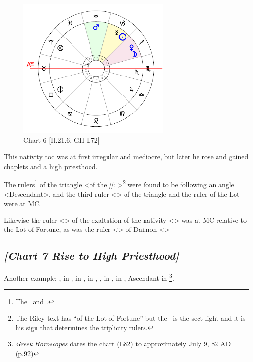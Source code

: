 \clearpage
\begin{figure}
\centering
\vspace{-20pt}
\includegraphics[width=0.68\textwidth]{charts/2_21_6}
\caption{Chart 6 [II.21.6, GH L72]}
\label{fig:chart06}
\end{figure}

This nativity too was at first irregular and mediocre, but later he rose and gained chaplets and a high priesthood. 

The rulers\footnote{The \Moon\, and \Venus.} of the triangle <of the \textsl{[\Sun]}: \Taurus\xspace \Virgo\xspace \Capricorn>\footnote{The Riley text has ``of the Lot of Fortune'' but the \Sun\, is the sect light and it is his sign that determines the triplicity rulers.}  were found to be following an angle <Descendant>, and the third ruler <\Mars> of the triangle and the ruler of the Lot were at MC. 

Likewise the ruler <\Sun> of the exaltation of the nativity <\Leo> was at MC relative to the Lot of Fortune, as was the ruler <\Mercury> of Daimon <\Gemini>

\newpage
\subsection*{\textit{[Chart 7 Rise to High Priesthood]}}

Another example: \Sun, \Mercury\xspace in \Cancer, \Moon\xspace in \Taurus, \Saturn\xspace in \Pisces, \Jupiter, \Mars\xspace in \Leo, \Venus\xspace in \Virgo, Ascendant in \Libra \footnote{\textit{Greek Horoscopes} dates the chart (L82) to approximately July 9, 82 AD (p.92)}.

